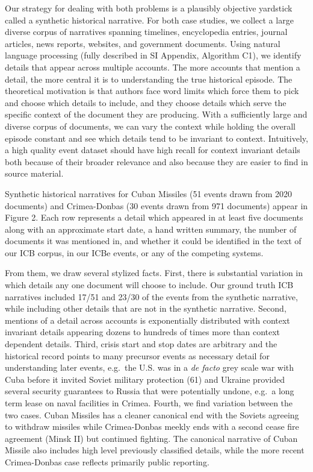 \documentclass{article}
\begin{document}
Our strategy for dealing with both problems is a plausibly objective
yardstick called a synthetic historical narrative. For both case
studies, we collect a large diverse corpus of narratives spanning
timelines, encyclopedia entries, journal articles, news reports,
websites, and government documents. Using natural language processing
(fully described in SI Appendix, Algorithm C1), we identify details that
appear across multiple accounts. The more accounts that mention a
detail, the more central it is to understanding the true historical
episode. The theoretical motivation is that authors face word limits
which force them to pick and choose which details to include, and they
choose details which serve the specific context of the document they are
producing. With a sufficiently large and diverse corpus of documents, we
can vary the context while holding the overall episode constant and see
which details tend to be invariant to context. Intuitively, a high
quality event dataset should have high recall for context invariant
details both because of their broader relevance and also because they
are easier to find in source material.

Synthetic historical narratives for Cuban Missiles (51 events drawn from
2020 documents) and Crimea-Donbas (30 events drawn from 971 documents)
appear in Figure 2. Each row represents a detail which appeared in at
least five documents along with an approximate start date, a hand
written summary, the number of documents it was mentioned in, and
whether it could be identified in the text of our ICB corpus, in our
ICBe events, or any of the competing systems.

From them, we draw several stylized facts. First, there is substantial
variation in which details any one document will choose to include. Our
ground truth ICB narratives included 17/51 and 23/30 of the events from
the synthetic narrative, while including other details that are not in
the synthetic narrative. Second, mentions of a detail across accounts is
exponentially distributed with context invariant details appearing
dozens to hundreds of times more than context dependent details. Third,
crisis start and stop dates are arbitrary and the historical record
points to many precursor events as necessary detail for understanding
later events, e.g.~the U.S. was in a \textit{de facto} grey scale war
with Cuba before it invited Soviet military protection (61) and Ukraine
provided several security guarantees to Russia that were potentially
undone, e.g.~a long term lease on naval facilities in Crimea. Fourth, we
find variation between the two cases. Cuban Missiles has a cleaner
canonical end with the Soviets agreeing to withdraw missiles while
Crimea-Donbas meekly ends with a second cease fire agreement (Minsk II)
but continued fighting. The canonical narrative of Cuban Missile also
includes high level previously classified details, while the more recent
Crimea-Donbas case reflects primarily public reporting.
\end{document}
